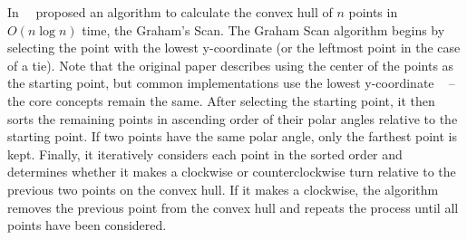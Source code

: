 In~\citeyear{graham_efficient_1972}~\cite{graham_efficient_1972} proposed an algorithm to calculate
the convex hull of $n$ points in $O(n \log n)$ time, the Graham's Scan.
The Graham Scan algorithm begins by selecting the point with the lowest y-coordinate (or the leftmost point in the case of a tie).
Note that the original paper describes using the center of the points as the starting point,
but common implementations use the lowest y-coordinate
~\multiplefootnoteseparator{} --
the core concepts remain the same.
After selecting the starting point, it then sorts the remaining points in ascending order
of their polar angles relative to the starting point.
If two points have the same polar angle, only the farthest point is kept.
Finally, it iteratively considers each point in the sorted order and determines whether it
makes a clockwise or counterclockwise turn relative to the previous two points on the convex hull.
If it makes a clockwise, the algorithm removes the previous point from the convex hull
and repeats the process until all points have been considered.


